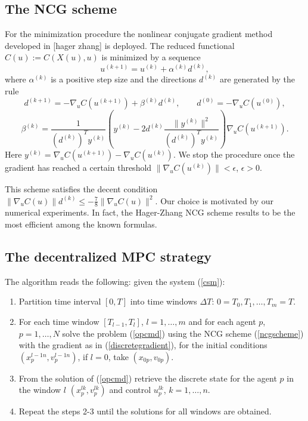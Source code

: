 \documentclass[a4paper,10pt, english]{article}
\begin{document}
 \subsection{The NCG scheme}
  For the minimization procedure the nonlinear conjugate gradient  method developed in [hager zhang] is deployed.
  The reduced functional $C(u):=C(X(u), u)$ is minimized by a sequence
  \begin{equation}
  u^{(k+1)} =   u^{(k)} + \alpha^{(k)} d^{(k)},
  \label{ncgscheme}
   \end{equation}  
  where $\alpha^{(k)}$ is a positive step size and the directions $d^{(k)}$ are generated by the rule
  \begin{equation}
  d^{(k+1)} = - \nabla_u C(u^{(k+1)}) + \beta^{(k)} d^{(k)}, \qquad d^{(0)} = -\nabla_u C(u^{(0)}),
  \label{drct}
  \end{equation}
  \begin{equation}
  \beta^{(k)} = \frac{1}{(d^{(k)})^T y^{(k)}} \left( y^{(k)} - 2d^{(k)}\frac{\|y^{(k)}\|^2}{(d^{(k)})^T y^{(k)}}\right)\nabla_u C(u^{(k+1)}).
  \label{drct}
  \end{equation}  
  Here $y^{(k)} = \nabla_u C(u^{(k+1)}) - \nabla_u C(u^{(k)})$. 
  We stop the procedure once the gradient has reached a certain threshold $\|\nabla_u C(u^{(k)})\| < \epsilon$, $\epsilon > 0$.
   
  This scheme satisfies the decent condition $\|\nabla_u C(u)\|d^{(k)} \leq -\frac{7}{8}\|\nabla_u C(u)\|^2$. Our choice is motivated by our numerical experiments. In fact, the Hager-Zhang NCG scheme results to be the most efficient among the known formulas. 
  
  
 
 \subsection{The decentralized MPC strategy}
  The algorithm reads the following: given the system (\ref{csm}):
  
 \begin{enumerate}
   \item Partition time interval $[0, T]$ into time windows $\Delta T$: $0 = T_0, T_1, \dots, T_m = T$.
   \item For each time window  $[T_{l-1}, T_{l}]$, $l = 1, \dots, m$ and for each agent $p$, $p = 1, \dots, N$  solve the problem (\ref{opcmd}) using the NCG scheme (\ref{ncgscheme}) with the gradient as in (\ref{discretegradient}), for the initial conditions $(x^{l-1n}_p, v^{l-1 n}_p)$, if $l = 0$, take $(x_{0p}, v_{0p})$.
   \item From the solution of (\ref{opcmd})  retrieve the discrete state for the agent $p$ in the window $l$ $(x^{lk}_p, v^{lk}_p)$ and control $u^{lk}_p$, $k = 1, \dots, n$.
   \item Repeat the steps 2-3 until the solutions for all windows are obtained.
 \end{enumerate}
 
\end{document}
